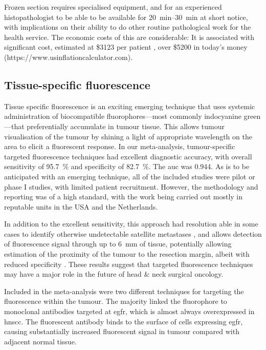 Frozen section requires specialised equipment, and for an experienced histopathologist to be able to be available for \SIrange{20}{30}{\minute} at short notice, with implications on their ability to do other routine pathological work for the health service. 
The economic costs of this are considerable: 
It is associated with significant cost, estimated at \$3123 per patient \cite{dinardoAccuracyUtilityCost2000}, over \$5200 in today's money (https://www.usinflationcalculator.com).

\subsection{Tissue-specific fluorescence}

Tissue specific fluorescence is an exciting emerging technique that uses systemic administration of biocompatible fluorophores---most commonly indocyanine green---that preferentially accumulate in tumour tissue.
This allows tumour visualisation of the tumour by shining a light of appropriate wavelength on the area to elicit a fluorescent response.
In our meta-analysis, tumour-specific targeted fluorescence techniques had excellent diagnostic accuracy, with overall sensitivity of \SI{95.7}{\percent} and specificity of \SI{82.7}{\percent}. 
The \gls{auc} was 0.944.
As is to be anticipated with an emerging technique, all of the included studies were pilot or phase I studies, with limited patient recruitment. 
However, the methodology and reporting was of a high standard, with the work being carried out mostly in reputable units in the USA and the Netherlands.

In addition to the excellent sensitivity, this approach had resolution able in some cases to identify otherwise undetectable satellite metastases \cite{voskuilf.j.ImageguidedSurgeryTumor2019}, and allows detection of fluorescence signal through up to \SI{6}{\milli\metre} of tissue, potentially allowing estimation of the proximity of the tumour to the resection margin, albeit with reduced specificity \cite{vankeulenRapidNoninvasiveFluorescence2019}.
These results suggest that targeted fluorescence techniques may have a major role in the future of head \& neck surgical oncology.

Included in the meta-analysis were two different techniques for targeting the fluorescence within the tumour.
The majority linked the fluorophore to monoclonal antibodies  targeted at \gls{egfr}, which is almost always overexpressed in \gls{hnscc}\cite{chungIncreasedEpidermalGrowth2016}.
The fluorescent antibody binds to the surface of cells expressing \gls{egfr}, causing substantially increased fluorescent signal in tumour compared with adjacent normal tissue.

